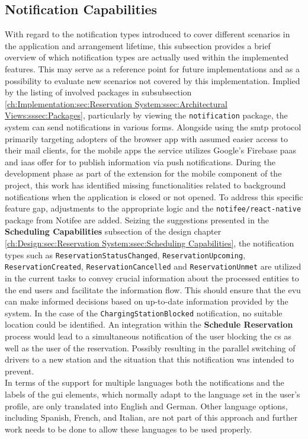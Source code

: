 \newpage

\subsection{Notification Capabilities}
\label{ch:Implementation:sec:Reservation System:ssec:Notification Capabilities}

With regard to the notification types introduced to cover different scenarios in the application and arrangement lifetime, this subsection provides a brief overview of which notification types are actually used within the implemented features.
This may serve as a reference point for future implementations and as a possibility to evaluate new scenarios not covered by this implementation.
Implied by the listing of involved packages in subsubsection \ref{ch:Implementation:sec:Reservation System:ssec:Architectural Views:sssec:Packages}, particularly by viewing the \texttt{notification} package, the system can send notifications in various forms.
Alongside using the \acrshort{smtp} protocol \cite{klensin_simple_2008} primarily targeting adopters of the browser app with assumed easier access to their mail clients, for the mobile apps the service utilizes Google's Firebase \cite{noauthor_firebase_nodate} \acrshort{paas} and \acrshort{iaas} offer for to publish information via push notifications.
During the development phase as part of the extension for the mobile component of the project, this work has identified missing functionalities related to background notifications when the application is closed or not opened. To address this specific feature gap, adjustments to the appropriate logic and the \texttt{notifee/react-native} package from Notifee \cite{noauthor_notifee_nodate} are added.
Seizing the suggestions presented in the \textbf{Scheduling Capabilities} subsection of the design chapter \ref{ch:Design:sec:Reservation System:ssec:Scheduling Capabilities}, the notification types such as \texttt{ReservationStatusChanged}, \texttt{ReservationUpcoming}, \texttt{ReservationCreated}, \texttt{ReservationCancelled} and \texttt{ReservationUnmet} are utilized in the current tasks to convey crucial information about the processed entities to the end users and facilitate the information flow.
This should ensure that the \acrshort{evu} can make informed decisions based on up-to-date information provided by the system.
In the case of the \texttt{ChargingStationBlocked} notification, no suitable location could be identified. An integration within the \textbf{Schedule Reservation} process would lead to a simultaneous notification of the user blocking the \acrshort{cs} as well as the user of the reservation. 
Possibly resulting in the parallel switching of drivers to a new station and the situation that this notification was intended to prevent. \\
\noindent In terms of the support for multiple languages both the notifications and the labels of the \acrshort{gui} elements, which normally adapt to the language set in the user's profile, are only translated into English and German.
Other language options, including Spanish, French, and Italian, are not part of this approach and further work needs to be done to allow these languages to be used properly.

